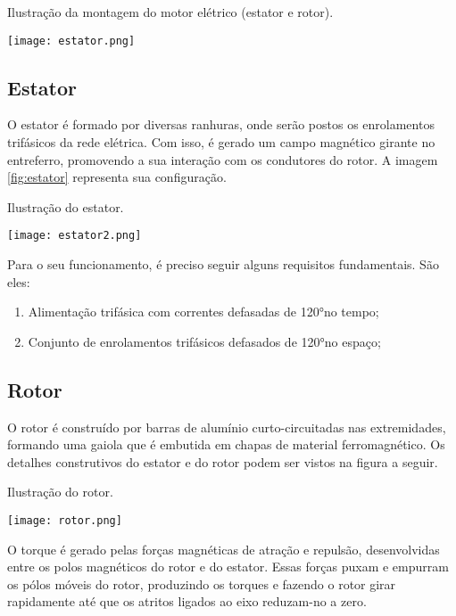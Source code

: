\documentclass[a4paper,12pt,oneside]{article}
\begin{document}
\begin{center}
\captionsetup{type=figure}
\caption{Ilustração da montagem do motor elétrico (estator e rotor).}
\texttt{[image: estator.png]}
\end{center}

\subsection{Estator}\hspace{0pt}

O estator é formado por diversas ranhuras, onde serão postos os enrolamentos trifásicos da rede elétrica. Com isso, é gerado um campo magnético girante no entreferro, promovendo a sua interação com os condutores do rotor. A imagem \ref{fig:estator} representa sua configuração.

\newpage
\begin{center}
\captionsetup{type=figure}
\caption{Ilustração do estator.}
\texttt{[image: estator2.png]}\label{fig:estator}
\end{center}

Para o seu funcionamento, é preciso seguir alguns requisitos fundamentais. São eles:

\begin{enumerate}
\item Alimentação trifásica com correntes defasadas de 120°no tempo;

\item Conjunto de enrolamentos trifásicos defasados de 120°no espaço;
\end{enumerate}

\subsection{Rotor}\hspace{0pt}
 
O rotor é construído por barras de alumínio curto-circuitadas nas extremidades, formando uma gaiola que é embutida em chapas de material ferromagnético. Os detalhes construtivos do estator e do rotor podem ser vistos na figura a seguir. 

\newpage
\begin{center}
\captionsetup{type=figure}
\caption{Ilustração do rotor.}
\texttt{[image: rotor.png]}
\end{center}

O torque é gerado pelas forças magnéticas de atração e repulsão, desenvolvidas entre os polos magnéticos do rotor e do estator. Essas forças puxam e empurram os pólos móveis do rotor, produzindo os torques e fazendo o rotor girar rapidamente até que os atritos ligados ao eixo reduzam-no a zero.
\end{document}
